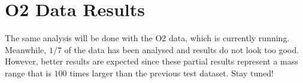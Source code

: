 \documentclass[aps,prd,twocolumn,superscriptaddress,preprintnumbers,floatfix,nofootinbib]{revtex4-2}
\begin{document}
\section{O2 Data Results}
The same analysis will be done with the O2 data, which is currently running. 
Meanwhile, $1/7$ of the data has been analysed and results do not look too good. 
However, better results are expected since these partial results represent a mass 
range that is $100$ times larger than the previous test dataset. Stay tuned!

\end{document}
